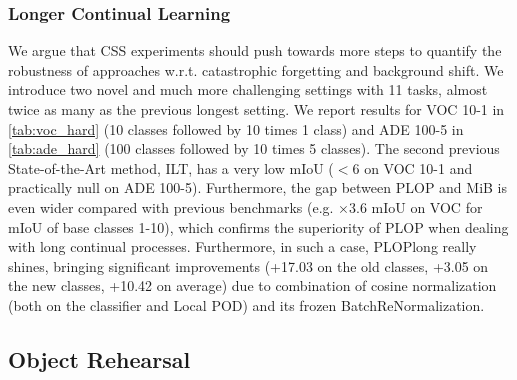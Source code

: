 \subsubsection{Longer Continual Learning}
We argue that CSS experiments should push towards more steps
\citep{wortsman2020supermasks,lomonaco2020ar1,douillard2020podnet,castro2018end_to_end_inc_learn} to
quantify the robustness of approaches w.r.t. catastrophic forgetting and background shift. We
introduce two novel and much more challenging settings with 11 tasks, almost twice as many as the
previous longest setting. We report results for VOC 10-1 in \autoref{tab:voc_hard} (10 classes
followed by 10 times 1 class) and ADE 100-5 in \autoref{tab:ade_hard} (100 classes followed by 10
times 5 classes). The second previous State-of-the-Art method, ILT, has a very low mIoU ($<6$ on VOC
10-1 and practically null on ADE 100-5). Furthermore, the gap between PLOP and MiB is even wider
compared with previous benchmarks (e.g. $\times$3.6 mIoU on VOC for mIoU of base classes 1-10),
which confirms the superiority of PLOP when dealing with long continual processes. Furthermore, in
such a case, PLOPlong really shines, bringing significant improvements (+17.03 \pp on the old
classes, +3.05 \pp on the new classes, +10.42 \pp on average) due to combination of cosine
normalization (both on the classifier and Local POD) and its frozen BatchReNormalization.

\subsection{Object Rehearsal}



